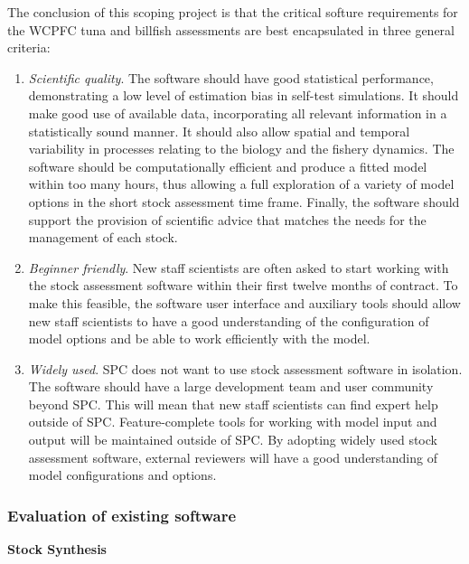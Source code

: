 \documentclass{SCreport}
\begin{document}
The conclusion of this scoping project is that the critical softure requirements
for the WCPFC tuna and billfish assessments are best encapsulated in three
general criteria:

\begin{enumerate}
  \item \textit{Scientific quality}. The software should have good statistical
  performance, demonstrating a low level of estimation bias in self-test
  simulations. It should make good use of available data, incorporating all
  relevant information in a statistically sound manner. It should also allow
  spatial and temporal variability in processes relating to the biology and the
  fishery dynamics. The software should be computationally efficient and produce
  a fitted model within too many hours, thus allowing a full exploration of a
  variety of model options in the short stock assessment time frame. Finally,
  the software should support the provision of scientific advice that matches
  the needs for the management of each stock.
  \item \textit{Beginner friendly}. New staff scientists are often asked to
  start working with the stock assessment software within their first twelve
  months of contract. To make this feasible, the software user interface and
  auxiliary tools should allow new staff scientists to have a good understanding
  of the configuration of model options and be able to work efficiently with the
  model.
  \item \textit{Widely used}. SPC does not want to use stock assessment software
  in isolation. The software should have a large development team and user
  community beyond SPC. This will mean that new staff scientists can find expert
  help outside of SPC. Feature-complete tools for working with model input and
  output will be maintained outside of SPC. By adopting widely used stock
  assessment software, external reviewers will have a good understanding of
  model configurations and options.
\end{enumerate}

\vspace{1ex}

\subsubsection{Evaluation of existing software}

\textbf{Stock Synthesis}

\vspace{-1ex}
\end{document}
